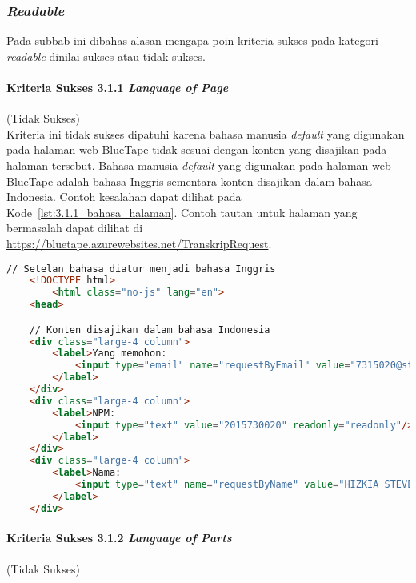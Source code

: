 \subsubsection{\textit{Readable}}
\label{subsubsec:kepatuhan_bluetape_readable}
Pada subbab ini dibahas alasan mengapa poin kriteria sukses pada kategori \textit{readable} dinilai sukses atau tidak sukses.

\paragraph{Kriteria Sukses 3.1.1 \textit{Language of Page}}
\label{par:kepatuhan_bluetape_kriteria_sukses_3.1.1}
(Tidak Sukses)\\

Kriteria ini tidak sukses dipatuhi karena bahasa manusia \textit{default} yang digunakan pada halaman web BlueTape tidak sesuai dengan konten yang disajikan pada halaman tersebut. Bahasa manusia \textit{default} yang digunakan pada halaman web BlueTape adalah bahasa Inggris sementara konten disajikan dalam bahasa Indonesia. Contoh kesalahan dapat dilihat pada \mbox{Kode \ref{lst:3.1.1_bahasa_halaman}}. Contoh tautan untuk halaman yang bermasalah dapat dilihat di \url{https://bluetape.azurewebsites.net/TranskripRequest}.

\begin{lstlisting}[frame=single, label={lst:3.1.1_bahasa_halaman}, language=HTML, caption=Pelanggaran Kriteria Sukses 3.1.1 pada Halaman Cetak Transkrip]
    // Setelan bahasa diatur menjadi bahasa Inggris
    <!DOCTYPE html>
        <html class="no-js" lang="en">
    <head>

    // Konten disajikan dalam bahasa Indonesia
    <div class="large-4 column">
        <label>Yang memohon:
            <input type="email" name="requestByEmail" value="7315020@student.unpar.ac.id" readonly="readonly"/>
        </label>
    </div>
    <div class="large-4 column">
        <label>NPM:
            <input type="text" value="2015730020" readonly="readonly"/>
        </label>
    </div>
    <div class="large-4 column">
        <label>Nama:
            <input type="text" name="requestByName" value="HIZKIA STEVEN" readonly="readonly"/>
        </label>
    </div>
\end{lstlisting}

\paragraph{Kriteria Sukses 3.1.2 \textit{Language of Parts}}
\label{par:kepatuhan_bluetape_kriteria_sukses_3.1.2}
(Tidak Sukses)\\

